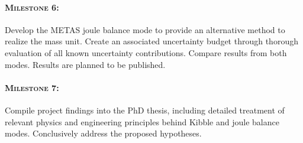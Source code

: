 \documentclass{article}
\begin{document}
\paragraph*{\normalfont \textsc{Milestone 6:}}
Develop the METAS joule balance mode to provide an alternative method to realize the mass unit. Create an associated uncertainty budget through thorough evaluation of all known uncertainty contributions. Compare results from both modes. Results are planned to be published.

\paragraph*{\normalfont \textsc{Milestone 7:}}
Compile project findings into the PhD thesis, including detailed treatment of relevant physics and engineering principles behind Kibble and joule balance modes. Conclusively address the proposed hypotheses.
\end{document}
